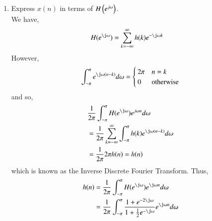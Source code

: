 \documentclass[journal,12pt,twocolumn]{IEEEtran}
\renewcommand\thesection{\arabic{section}}
\begin{document}
\begin{enumerate}[label=\thesection.\arabic*]
\item Express $x(n)$ in terms of $H\left(e^{j \omega}\right)$.\\
\solution We have,
\begin{align}
	H(e^{\j\omega}) &= \sum_{k = -\infty}^{\infty}h(k)e^{-\j\omega k}
\end{align}
However,
\begin{align}
	\int_{-\pi}^{\pi}e^{\j\omega(n - k)}d\omega =
	\begin{cases}
		2\pi & n = k \\
		0 & \textrm{otherwise}
	\end{cases}
\end{align}
and so,
\begin{align}
	&\frac{1}{2\pi}\int_{-\pi}^{\pi}H(e^{\j\omega})e^{j\omega n}d\omega \\
	&= \frac{1}{2\pi}\sum_{k = -\infty}^{\infty}\int_{-\pi}^{\pi}h(k)e^{\j\omega(n - k)}d\omega \\
	&= \frac{1}{2\pi}2\pi h(n) = h(n)
\end{align}
which is known as the Inverse Discrete Fourier Transform. Thus,
\begin{align}
	h(n) &= \frac{1}{2\pi}\int_{-\pi}^{\pi}H(e^{\j\omega})e^{\j\omega n}d\omega \\
	&= \frac{1}{2\pi}\int_{-\pi}^{\pi}\frac{1 + e^{-2\j\omega}}{1 + \frac{1}{2}e^{-\j\omega}}e^{\j\omega n}d\omega
	\label{eq:idtft}
\end{align}
\end{enumerate}
\end{document}
